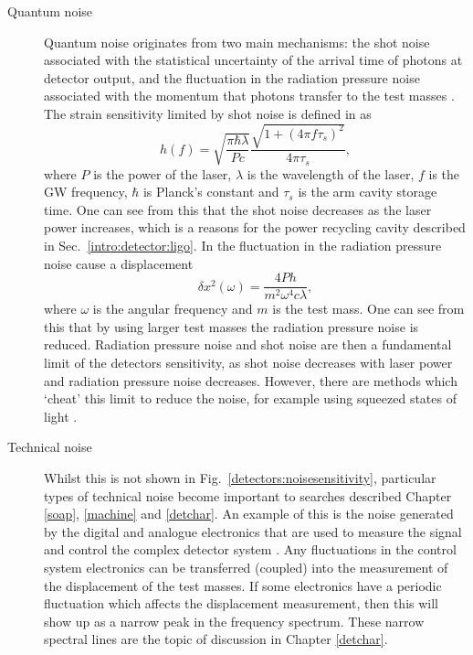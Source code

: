 \begin{description}
\item[Quantum noise] Quantum noise originates from two main mechanisms: the shot noise associated with the
statistical uncertainty of the arrival time of photons at detector output, and the fluctuation in the radiation pressure noise associated with the momentum that photons transfer to the test masses \citep{aasi2013EnhancedSensitivity}.
The strain sensitivity limited by shot noise is defined in \citep{abbott2009LIGOLaser} as
\begin{equation}
	h(f) = \sqrt{\frac{\pi \hbar \lambda}{P c}} \frac{\sqrt{1 + (4 \pi f \tau_s)^2}}{4 \pi \tau_s},
\end{equation}
where $P$ is the power of the laser, $\lambda$ is the wavelength of the laser, $f$ is the \gls{GW} frequency, $\hbar$ is Planck's constant and $\tau_s$ is the arm cavity storage time. 
One can see from this that the shot noise decreases as the laser power increases, which is a reasons for the power recycling cavity described in
Sec.~\ref{intro:detector:ligo}.
In \citep{pitkin2011GravitationalWave} the fluctuation in the radiation pressure noise cause a displacement
\begin{equation}
	\delta x^2(\omega) = \frac{4 P h}{m^2 \omega^4 c \lambda},
\end{equation}
where $\omega$ is the angular frequency and $m$ is the test mass. 
One can see from this that by using larger test masses the radiation pressure noise is reduced.
Radiation pressure noise and shot noise are then a fundamental limit of the detectors sensitivity, as shot noise decreases with laser power and radiation pressure noise decreases.
However, there are methods which `cheat' this limit to reduce the noise, for example using squeezed states of light \citep{aasi2013EnhancedSensitivity}. 

\item[Technical noise] Whilst this is not shown
in Fig.~\ref{detectors:noisesensitivity}, particular types of technical noise
become important to searches
described Chapter \ref{soap}, \ref{machine} and \ref{detchar}. An example of this is the noise generated by the digital and analogue electronics that are used to measure the signal and control the complex
detector system \citep{martynov2016SensitivityAdvanced}. Any fluctuations in the control system electronics can be transferred (coupled) into the measurement of the displacement of the test masses. 
If some electronics have a periodic fluctuation which affects the displacement
measurement, then this will show up as a narrow peak in the frequency spectrum. These narrow spectral lines are the topic of discussion in Chapter \ref{detchar}.

\end{description}

